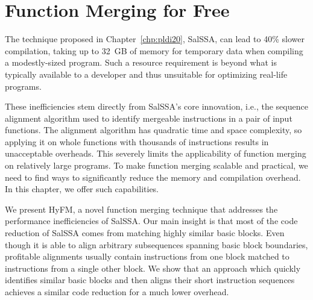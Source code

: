 
\chapter{Function Merging for Free} \label{chp:lctes21}


\renewcommand{\ProjName}{{HyFM}\xspace}
\newcommand{\SOAName}{{SalSSA}\xspace}
\newcommand{\NW}{{Needleman-Wunsch}\xspace}


The technique proposed in Chapter~\ref{chp:pldi20}, {\SOAName}, can lead to 40\% slower compilation, taking up to 32~GB of memory for temporary data when compiling a modestly-sized program.
Such a resource requirement is beyond what is typically available to a developer and thus unsuitable for optimizing real-life programs.

These inefficiencies stem directly from {\SOAName}'s core innovation, i.e., the sequence alignment algorithm used to identify mergeable instructions in a pair of input functions.
The alignment algorithm has quadratic time and space complexity, so applying it on whole functions with thousands of instructions results in unacceptable overheads.
This severely limits the applicability of function merging on relatively large programs.
To make function merging scalable and practical, we need to find ways to significantly reduce the memory and compilation overhead.
In this chapter, we offer such capabilities.   


We present \ProjName, a novel function merging technique that addresses the performance inefficiencies of \SOAName.
Our main insight is that most of the code reduction of {\SOAName} comes from matching highly similar basic blocks.
Even though it is able to align arbitrary subsequences spanning basic block boundaries, profitable alignments usually contain instructions from one block matched to instructions from a single other block.
We show that an approach which quickly identifies similar basic blocks and then aligns their short instruction sequences achieves a similar code reduction for a much lower overhead.

